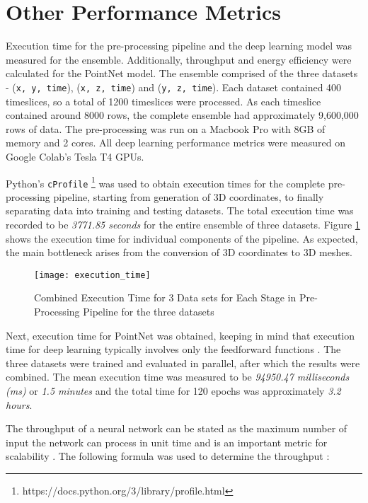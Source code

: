 \section{Other Performance Metrics}
Execution time for the pre-processing pipeline and the deep learning model was measured for the ensemble. Additionally, throughput and energy efficiency were calculated for the PointNet model. The ensemble comprised of the three datasets - (\texttt{x, y, time}), (\texttt{x, z, time}) and (\texttt{y, z, time}). Each dataset contained 400 timeslices, so a total of 1200 timeslices were processed. As each timeslice contained around 8000 rows, the complete ensemble had approximately 9,600,000 rows of data. The pre-processing was run on a Macbook Pro with 8GB of memory and 2 cores. All deep learning performance metrics were measured on Google Colab's Tesla T4 GPUs.

Python's \texttt{cProfile} \footnote{https://docs.python.org/3/library/profile.html} was used to obtain execution times for the complete pre-processing pipeline, starting from generation of 3D coordinates, to finally separating data into training and testing datasets. The total execution time was recorded to be \textit{3771.85 seconds} for the entire ensemble of three datasets. Figure \ref{fig:exec_time} shows the execution time for individual components of the pipeline. As expected, the main bottleneck arises from the conversion of 3D coordinates to 3D meshes. 

\begin{figure}[ht!]
    \centering
    \texttt{[image: execution\_time]}
    \caption{Combined Execution Time for 3 Data sets for Each Stage in Pre-Processing Pipeline for the three datasets}
    \label{fig:exec_time}
\end{figure}

Next, execution time for PointNet was obtained, keeping in mind that execution time for deep learning typically involves only the feedforward functions \cite{yang2020note, teich2018plaster}. The three datasets were trained and evaluated in parallel, after which the results were combined. The mean execution time was measured to be \textit{94950.47 milliseconds (ms)} or \textit{1.5 minutes} and the total time for 120 epochs was approximately \textit{3.2 hours}.  

The throughput of a neural network can be stated as the maximum number of input the network can process in unit time and is an important metric for scalability \cite{hanhirova2018latency}.   The following formula was used to determine the throughput \cite{hanhirova2018latency}:

